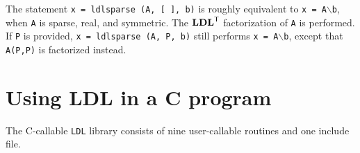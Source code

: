 \documentclass[12pt]{article}
\newcommand{\m}[1]{{\bf{#1}}}       %
\newcommand{\tr}{^{\sf T}}          %
\begin{document}
The statement {\tt x = ldlsparse (A, [ ], b)} is roughly equivalent to
{\tt x = A}$\backslash${\tt b}, when {\tt A} is sparse, real, and symmetric.
The $\m{LDL}\tr$ factorization of {\tt A} is performed.  If {\tt P} is
provided, {\tt x = ldlsparse (A, P, b)} still performs
{\tt x = A}$\backslash${\tt b}, except that {\tt A(P,P)} is factorized
instead.

\section{Using LDL in a C program}
\label{C}

The C-callable {\tt LDL} library consists of nine user-callable routines
and one include file.
\end{document}
